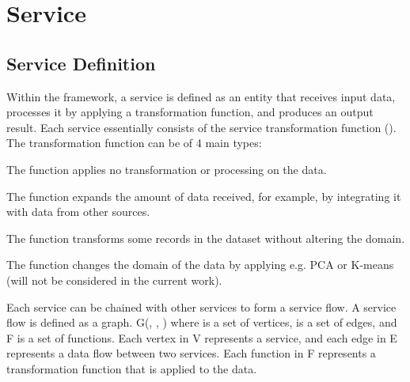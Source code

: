 \section{Service}
\subsection{Service Definition}
Within the framework, a service is defined as an entity that receives input data, processes it by applying a transformation function, and produces an output result.
Each service essentially consists of the  service transformation function (\F{}).
The transformation function can be of 4 main types:
\begin{enumerate*}[label=\roman*)]
  \item {} The function applies no transformation or processing on the data.
  \item {} The function expands the amount of data received, for example, by integrating it with data from other sources.
  \item {} The function transforms some records in the dataset without altering the domain.
  \item {}  The function changes the domain of the data by applying e.g. PCA or K-means (will not be considered in the current work).
\end{enumerate*}


Each service can be chained with other services to form a service flow.
A service flow is defined as a graph. G(\V, \E, \F{}) where \V is a set of vertices, \E is a set of edges, and F is a set of functions.
Each vertex in V represents a service, and each edge in E represents a data flow between two services.
Each function in F represents a transformation function that is applied to the data.


